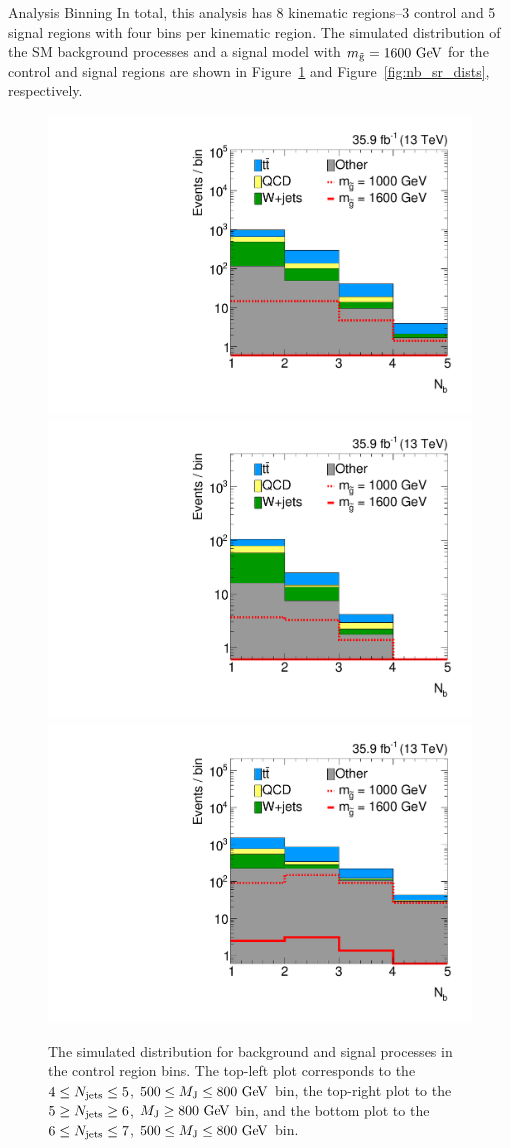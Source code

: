 \begin{section}{Analysis Binning}
In total, this analysis has 8 kinematic regions--3 control and 5 signal regions with four \Nb bins per kinematic region.
The simulated \Nb distribution of the SM background processes and a signal model with $m_{\tilde{\mathrm{g}}} = 1600~\mathrm{Ge\kern -0.1em V}$ for the control and signal regions 
are shown in Figure~\ref{fig:nb_cr_dists} and Figure~\ref{fig:nb_sr_dists}, respectively.

\begin{figure}[tbp!]
\centering
\includegraphics[angle=0,width=0.35\columnwidth]{fig/nb_nlep1_nj45_lowmj.pdf}
\includegraphics[angle=0,width=0.35\columnwidth]{fig/nb_nlep1_nj45_highmj.pdf}
\includegraphics[angle=0,width=0.35\columnwidth]{fig/nb_nlep1_nj67_lowmj.pdf}
\caption{The simulated \Nb distribution for background and signal processes in the control region bins.
The top-left plot corresponds to the $4 \leq N_{\mathrm{jets}} \leq 5$, $500 \leq M_{\mathrm{J}} \leq 800~\mathrm{Ge\kern -0.1em V}$ bin, the top-right plot to the $5 \geq N_{\mathrm{jets}} \geq 6$, $M_{\mathrm{J}} \geq 800~\mathrm{Ge\kern -0.1em V}$ bin, and the bottom plot to the $6 \leq N_{\mathrm{jets}} \leq 7$, $500 \leq M_{\mathrm{J}} \leq 800~\mathrm{Ge\kern -0.1em V}$ bin.}
\label{fig:nb_cr_dists}
\end{figure}


\end{section}
